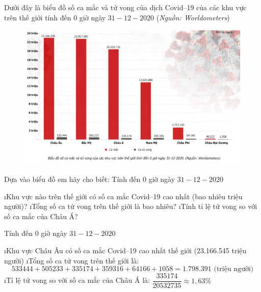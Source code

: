 \begin{bt}
	Dưới đây là biểu đồ số ca mắc và tử vong của dịch Covid--19 của các khu vực trên thế giới tính đến 0 giờ ngày $31-12-2020$ (\textit{Nguồn: Worldometers}) 
	\begin{figure}[H]
		\centering
		\vspace*{-5pt}
		\captionsetup{labelformat= empty, justification=centering}
		\includegraphics[width=0.5\linewidth]{24}
		\vspace*{-10pt}
	\end{figure}
	Dựa vào biểu đồ em hãy cho biết: Tính đến 0 giờ ngày $31-12-2020$
	\begin{enumerate}[a),leftmargin=*]
		\i Khu vực nào trên thế giới có số ca mắc Covid--19 cao nhất (bao nhiêu triệu người)? 
		\i Tổng số ca tử vong trên thế giới là bao nhiêu?
		\i Tính tỉ lệ tử vong so với số ca mắc của Châu Á?
	\end{enumerate}
	\begin{loigiaichuong42}
		Tính đến 0 giờ ngày $31-12-2020$
		\begin{enumerate}[a),leftmargin=*]
			\i Khu vực Châu Âu có số ca mắc Covid--19 cao nhất thế giới (23.166.545 triệu người)
			\i Tổng số ca tử vong trên thế giới là: 
			\[533444 + 505233 + 335174 + 359316 + 64166 + 1058 = 1.798.391 \text{ (triệu người)}\]  
			\i Tỉ lệ tử vong so với số ca mắc của Châu Á là:  $\dfrac{{335174}}{{20532735}} \approx 1,63\%$
		\end{enumerate}
	\end{loigiaichuong42}
\end{bt}
